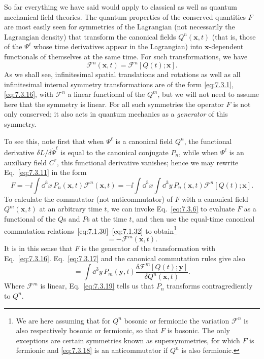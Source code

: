 So far everything we have said would apply to classical as well as quantum
mechanical field theories. The quantum properties of the conserved quantities
$F$ are most easily seen for symmetries of the Lagrangian (not necessarily the
Lagrangian density) that transform the canonical fields $Q^n(\mathbf{x},t)$
(that is, those of the $\Psi^\ell$ whose time derivatives appear in the
Lagrangian) into $\mathbf{x}$-dependent functionals of themselves at the same
time. For such transformations, we have
\begin{equation}
\mathcal{F}^n(\mathbf{x},t)=\mathcal{F}^n[Q(t);\mathbf{x}].
\tag{7.3.16}\label{eq:7.3.16}
\end{equation}
As we shall see, infinitesimal spatial translations and rotations as well as
all infinitesimal internal symmetry transformations are of the form \eqref{eq:7.3.1},
\eqref{eq:7.3.16}, with $\mathcal{F}^n$ a linear functional of the $Q^m$, but we will not
need to assume here that the symmetry is linear. For all such symmetries the
operator $F$ is not only conserved; it also acts in quantum mechanics as a
\emph{generator} of this symmetry.

To see this, note first that when $\Psi^\ell$ is a canonical field $Q^n$, the
functional derivative $\delta L/\delta\dot\Psi^\ell$ is equal to the canonical
conjugate $P_n$, while when $\Psi^\ell$ is an auxiliary field $C^r$, this
functional derivative vanishes; hence we may rewrite Eq.~\eqref{eq:7.3.11} in the form
\begin{equation}
F=-\ii\int \dd^3x\,P_n(\mathbf{x},t)\mathcal{F}^n(\mathbf{x},t)
=-\ii\int \dd^3x\int \dd^3y\,P_n(\mathbf{x},t)
\mathcal{F}^n[Q(t);\mathbf{x}].
\tag{7.3.17}\label{eq:7.3.17}
\end{equation}
To calculate the commutator (not anticommutator) of $F$ with a canonical field
$Q^m(\mathbf{x},t)$ at an arbitrary time $t$, we can invoke Eq.~\eqref{eq:7.3.6} to
evaluate $F$ as a functional of the $Q$s and $P$s at the time $t$, and then use
the equal-time canonical commutation relations~\eqref{eq:7.1.30}--\eqref{eq:7.1.32} to
obtain\footnote{We are here assuming that for $Q^n$ bosonic or fermionic the
variation $\mathcal{F}^n$ is also respectively bosonic or fermionic, so that
$F$ is bosonic. The only exceptions are certain symmetries known as
supersymmetries, for which $F$ is fermionic and \eqref{eq:7.3.18} is an anticommutator if
$Q^n$ is also fermionic.}
\begin{equation}
[F,Q^m(\mathbf{x},t)]=-\mathcal{F}^m(\mathbf{x},t).
\tag{7.3.18}\label{eq:7.3.18}
\end{equation}
It is in this sense that $F$ is the generator of the transformation with
Eq.~\eqref{eq:7.3.16}. Eq.~\eqref{eq:7.3.17} and the canonical commutation rules give also
\begin{equation}
[F,P_n(\mathbf{x},t)]
=\int \dd^3y\,P_m(\mathbf{y},t)
\frac{\delta\mathcal{F}^m[Q(t);\mathbf{y}]}
{\delta Q^n(\mathbf{x},t)}.
\tag{7.3.19}\label{eq:7.3.19}
\end{equation}
Where $\mathcal{F}^m$ is linear, Eq.~\eqref{eq:7.3.19} tells us that $P_n$ transforms
contragrediently to $Q^n$.

